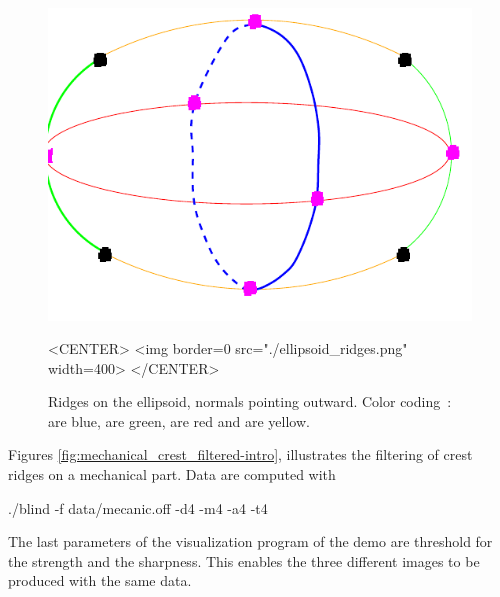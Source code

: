 \begin{figure}[!ht]
\begin{ccTexOnly}
\centerline{
\includegraphics[width=.5\linewidth]{Ridges_3/ellipsoid_ridges}}
\end{ccTexOnly}
\caption{Ridges on the ellipsoid, normals pointing outward.
 Color coding~:  are blue,
 are green,  are red and 
 are yellow. }
\label{ellipsoid-ridges-example}
\begin{ccHtmlOnly}
<CENTER> <img border=0 src="./ellipsoid_ridges.png" width=400>
</CENTER>
\end{ccHtmlOnly}
\end{figure}


Figures \ref{fig:mechanical_crest_filtered-intro}, illustrates the
filtering of crest ridges on a mechanical part. Data are computed with 
\begin{ccExampleCode}
./blind -f data/mecanic.off -d4 -m4 -a4 -t4
\end{ccExampleCode}
The last parameters of the visualization program of the demo are
threshold for the strength and the sharpness. This enables the three
different images to be produced with the same data.

